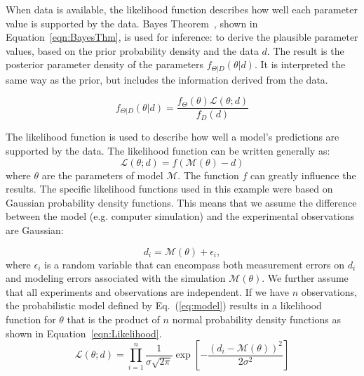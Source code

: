 When data is available, the likelihood function describes how well 
each parameter value is supported by the data. Bayes Theorem~\cite{Jaynes}, 
shown in Equation~\ref{eqn:BayesThm}, is used for inference:  to 
derive the plausible parameter values, based on the prior probability 
density and the data $d$.  The result is the posterior parameter density 
of the parameters $f_{\Theta |D}\left( {\theta |d} \right)$. It is 
interpreted the same way as the prior, but includes the information 
derived from the data.
 
\begin{equation}
  \label{eqn:BayesThm}
  {f_{\Theta |D}}\left( {\theta |d} \right) = \frac{{{f_\Theta }\left( \theta  \right)\mathcal{L}\left( {\theta ;d} \right)}}{{{f_D}\left( d \right)}}
\end{equation}

The likelihood function is used to describe how well a model's 
predictions are supported by the data. 
The likelihood function can be written generally as:
\begin{equation*}
  \mathcal{L}\left( {\theta ;d} \right) = f\left( {\mathcal{M}\left( \theta  \right) - d} \right)
\end{equation*}
where $\theta$ are the parameters of model $\mathcal{M}$. 
The function $f$ can greatly influence the results. 
The specific likelihood functions used in this example were based on 
Gaussian probability density functions.  This means that we assume 
the difference between the model (e.g. computer simulation)
and the experimental observations are Gaussian: 

\begin{equation}\label{eq:model}
d_i = \mathcal{M}(\theta) + \epsilon_i,
\end{equation}
where $\epsilon_i$ is a random variable that can encompass both
measurement errors on $d_i$ and modeling errors associated with the
simulation $\mathcal{M}(\theta)$.   We further 
assume that all experiments and observations are independent. 
If we have $n$ observations,  
the probabilistic model defined by Eq.~(\ref{eq:model}) results in a
likelihood function for $\theta$ that is the product of $n$ normal
probability density functions
as shown in Equation~\ref{eqn:Likelihood}.
\begin{equation}\label{eqn:Likelihood}  
\mathcal{L}({\theta};d) = \prod_{i=1}^n
\frac{1}{\sigma \sqrt{2\pi}} \exp
\left[ - \frac{\left(d_i-\mathcal{M}({\theta})\right)^2}{2\sigma^2} \right]
\end{equation}

